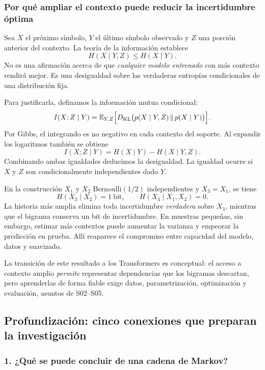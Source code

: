 \subsubsection*{Por qué ampliar el contexto puede reducir la incertidumbre óptima}

Sea $X$ el próximo símbolo, $Y$ el último símbolo observado y $Z$
una porción anterior del contexto. La teoría de la información
establece
\[
H(X\mid Y,Z)\le H(X\mid Y).
\]
No es una afirmación acerca de que \emph{cualquier modelo entrenado}
con más contexto rendirá mejor. Es una desigualdad sobre las verdaderas
entropías condicionales de una distribución fija.

Para justificarla, definamos la información mutua condicional:
\[
I(X;Z\mid Y)
=\mathbb E_{Y,Z}\Bigl[D_{\rm KL}\bigl(
 p(X\mid Y,Z)\,\|\,p(X\mid Y)
\bigr)\Bigr].
\]
Por Gibbs, el integrando es no negativo en cada contexto del soporte.
Al expandir los logaritmos también se obtiene
\[
I(X;Z\mid Y)=H(X\mid Y)-H(X\mid Y,Z).
\]
Combinando ambas igualdades deducimos la desigualdad.
La igualdad ocurre si $X$ y $Z$ son condicionalmente independientes dado $Y$.

\begin{ejemplo}
En la construcción $X_1$ y $X_2$ Bernoulli$(1/2)$ independientes y
$X_3=X_1$, se tiene
\[
H(X_3\mid X_2)=1\ \text{bit},
\qquad H(X_3\mid X_1,X_2)=0.
\]
La historia más amplia elimina toda incertidumbre \emph{verdadera}
sobre $X_3$, mientras que el bigrama conserva un bit de incertidumbre.
En muestras pequeñas, sin embargo, estimar más contextos puede aumentar
la varianza y empeorar la predicción en prueba. Allí reaparece el
compromiso entre capacidad del modelo, datos y suavizado.
\end{ejemplo}
La transición de este resultado a los Transformers es conceptual:
el acceso a contexto amplio \emph{permite} representar dependencias
que los bigramas descartan, pero aprenderlas de forma fiable exige
datos, parametrización, optimización y evaluación, asuntos de S02--S05.



\subsection{Profundización: cinco conexiones que preparan la investigación}


\subsubsection*{1. ¿Qué se puede concluir de una cadena de Markov?}


